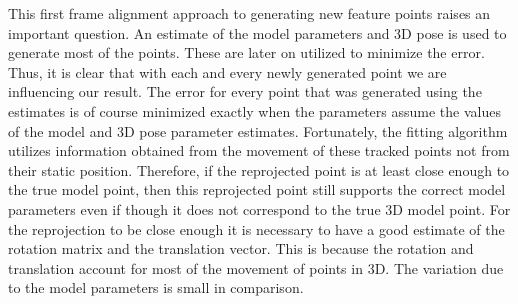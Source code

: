 \documentclass[11pt,a4paper]{report}
\begin{document}
This first frame alignment approach to generating new feature points raises an important question. An estimate of the model
parameters and 3D pose is used to generate most of the points. These are later on
utilized to minimize the error. Thus, it is clear that with each and every newly
generated point we are influencing our result. The error for every point that was generated
using the estimates is of course minimized exactly when the parameters
assume the values of the model and 3D pose parameter estimates. Fortunately,
the fitting algorithm utilizes information obtained from the movement of these tracked
points not from their static position. Therefore, if the reprojected point is at least
close enough to the true model point, then this reprojected point still supports
the correct model parameters even if though it does not correspond to the true
3D model point. For the reprojection to be close enough it is necessary to have
a good estimate of the rotation matrix and the translation vector. This is
because the rotation and translation account for most of the movement of points in 3D. The variation
due to the model parameters is small in comparison.
\end{document}

